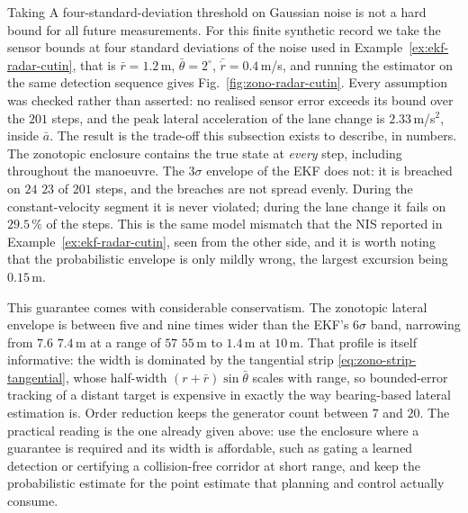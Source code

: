 \documentclass[graybox,envcountchap]{style/SNmono}
\providecommand{\DIFadd}[1]{{\protect\color{blue} #1}} %
\providecommand{\DIFdel}[1]{{\protect\color{red} #1}} %
\providecommand{\DIFaddbegin}{} %
\providecommand{\DIFaddend}{} %
\providecommand{\DIFdelbegin}{} %
\providecommand{\DIFdelend}{} %
\begin{document}
\begin{example}
\DIFdelbegin \DIFdel{Taking }\DIFdelend \DIFaddbegin \DIFadd{A four-standard-deviation threshold on Gaussian noise is not a hard bound for all future measurements. For this finite synthetic record we take }\DIFaddend the sensor bounds at four standard deviations of the noise used in
Example~\ref{ex:ekf-radar-cutin}, that is $\bar r=1.2$\,m,
$\bar\theta=2^{\circ}$, $\bar{\dot r}=0.4$\,m/s, and running the estimator on
the same detection sequence gives Fig.~\ref{fig:zono-radar-cutin}. Every
assumption was checked rather than asserted: no realised sensor error exceeds
its bound over the $201$ steps, and the peak lateral acceleration of the lane
change is $2.33$\,m/s$^{2}$, inside $\bar a$. The result is the trade-off this
subsection exists to describe, in numbers. The zonotopic enclosure contains the
true state at \emph{every} step, including throughout the manoeuvre. The
$3\sigma$ envelope of the EKF does not: it is breached on \DIFdelbegin \DIFdel{$24$ }\DIFdelend \DIFaddbegin \DIFadd{$23$ }\DIFaddend of $201$ steps,
and the breaches are not spread evenly. During the constant-velocity segment it
is never violated; during the lane change it fails on $29.5\,\%$ of the steps.
This is the same model mismatch that the NIS reported in
Example~\ref{ex:ekf-radar-cutin}, seen from the other side, and it is worth
noting that the probabilistic envelope is only mildly wrong, the largest
excursion being $0.15$\,m.

This guarantee comes with considerable conservatism. The zonotopic lateral envelope
is between five and nine times wider than the EKF's $6\sigma$ band, narrowing
from \DIFdelbegin \DIFdel{$7.6$}\DIFdelend \DIFaddbegin \DIFadd{$7.4$}\DIFaddend \,m at a range of \DIFdelbegin \DIFdel{$57$}\DIFdelend \DIFaddbegin \DIFadd{$55$}\DIFaddend \,m to $1.4$\,m at $10$\,m. That profile is
itself informative: the width is dominated by the tangential strip
\eqref{eq:zono-strip-tangential}, whose half-width $(r+\bar r)\sin\bar\theta$
scales with range, so bounded-error tracking of a distant target is expensive
in exactly the way bearing-based lateral estimation is. Order reduction keeps
the generator count between $7$ and $20$. The practical reading is the one
already given above: use the enclosure where a guarantee is required and its
width is affordable, such as gating a learned detection or certifying a
collision-free corridor at short range, and keep the probabilistic estimate for
the point estimate that planning and control actually consume.
\end{example}
\end{document}
